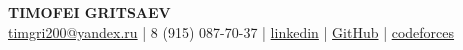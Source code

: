 \begin{center}
\textbf{\Large TIMOFEI GRITSAEV}\\[2pt] %
\href{mailto:timgri93@gmail.com}{timgri200@yandex.ru} | 
8 (915) 087-70-37 | 
\href{https://www.linkedin.com/in/timofei-gritsaev-75b72420a/}{linkedin} |
\href{https://github.com/tgritsaev}{GitHub} |
\href{https://codeforces.com/profile/tgritsaev}{codeforces}
\end{center}